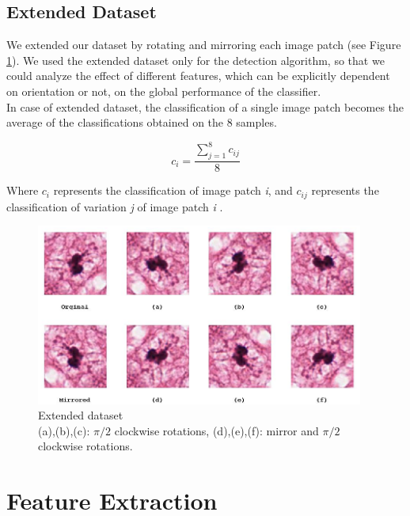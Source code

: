 \vspace{0.5cm}

\subsection{Extended Dataset}
\label{ch4:ed}

We extended our dataset by rotating and mirroring each image patch (see Figure \ref{ch4:fig1}). We used the extended dataset only for the detection algorithm, so that we could analyze
the effect of different features, which can be explicitly dependent on orientation or not, on the global performance of the classifier.\\
In case of extended dataset, the classification of a single image patch becomes the average of the classifications obtained on the 8 samples.

\begin{equation}
 c_{i} = \frac{\sum_{j=1}^{8} c_{ij}}{8}
\end{equation}

Where $c_{i}$ represents the classification of image patch \textit{i}, and $c_{ij}$ represents the classification of variation \textit{j} of image patch \textit{i} .



\begin{figure}[!hbt]
  \centering
    \includegraphics[width=0.96\textwidth]{./images/rotDataset_mod1.png}
  \caption[Extended Dataset]{Extended dataset\\(a),(b),(c): $\pi/2$ clockwise rotations, (d),(e),(f): mirror and $\pi/2$ clockwise rotations.}
  \label{ch4:fig1}
\end{figure}  

\vspace{0.5cm}




\section{Feature Extraction}
\label{ch4:FE}

